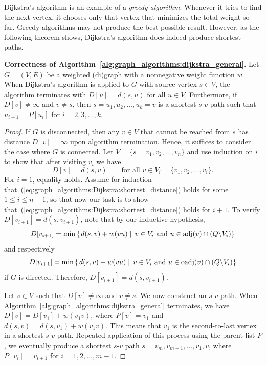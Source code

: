 Dijkstra's algorithm is an example of a \emph{greedy algorithm}.
Whenever it tries to find the next vertex, it chooses only that vertex
that minimizes the total weight so far. Greedy algorithms may not
produce the best possible result. However, as the following theorem
shows, Dijkstra's algorithm does indeed produce shortest paths.

\begin{theorem}
\textbf{Correctness of
  Algorithm~\ref{alg:graph_algorithms:dijkstra_general}.}
Let $G = (V, E)$ be a weighted (di)graph with a nonnegative weight
function $w$. When Dijkstra's algorithm is applied to $G$ with source
vertex $s \in V$, the algorithm terminates with $D[u] = d(s,u)$ for
all $u \in V$. Furthermore, if $D[v] \neq \infty$ and $v \neq s$, then
$s=u_1, u_2, \dots, u_k = v$ is a shortest $s$-$v$ path such that
$u_{i-1} = P[u_i]$ for $i = 2,3,\dots,k$.
\end{theorem}

\begin{proof}
If $G$ is disconnected, then any $v \in V$ that cannot be reached from
$s$ has distance $D[v] = \infty$ upon algorithm termination. Hence, it
suffices to consider the case where $G$ is connected. Let
$V = \{s=v_1, v_2, \dots, v_n\}$ and use induction on $i$ to show that
after visiting $v_i$ we have
%
\begin{equation}
\label{eq:graph_algorithms:Dijkstra:shortest_distance}
D[v]
=
d(s,v)
\qquad
\text{for all $v \in V_i = \{v_1, v_2, \dots, v_i\}$}.
\end{equation}
%
For $i = 1$, equality holds. Assume for induction
that~(\ref{eq:graph_algorithms:Dijkstra:shortest_distance}) holds for
some $1 \leq i \leq n - 1$, so that now our task is to show
that~(\ref{eq:graph_algorithms:Dijkstra:shortest_distance}) holds for
$i + 1$. To verify $D[v_{i+1}] = d(s, v_{i+1})$, note that by our
inductive hypothesis,
\[
D[v_{i+1}]
=
\min \left\{
\left. d(s,v) + w(vu) \;\right|\;
v \in V_i \text{ and } u \in \operatorname*{adj}(v) \cap (Q \backslash V_i)
\right\}
\]
and respectively
\[
D[v_{i+1}]
=
\min \left\{
\left. d(s,v) + w(vu) \;\right|\;
v \in V_i \text{ and } u \in \operatorname*{oadj}(v) \cap (Q \backslash V_i)
\right\}
\]
if $G$ is directed. Therefore, $D[v_{i+1}] = d(s, v_{i+1})$.

Let $v \in V$ such that $D[v] \neq \infty$ and $v \neq s$. We now
construct an $s$-$v$ path. When
Algorithm~\ref{alg:graph_algorithms:dijkstra_general} terminates, we
have $D[v] = D[v_1] + w(v_1 v)$, where $P[v] = v_1$ and
$d(s,v) = d(s, v_1) + w(v_1 v)$. This means that $v_1$ is the
second-to-last vertex in a shortest $s$-$v$ path. Repeated application
of this process using the parent list $P$, we eventually produce a
shortest $s$-$v$ path $s=v_m, v_{m-1}, \dots, v_1, v$, where
$P[v_i] = v_{i+1}$ for $i = 1, 2, \dots, m - 1$.
\end{proof}

